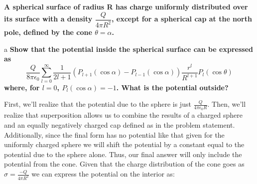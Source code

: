 \begin{homeworkProblem}
\textbf{A spherical surface of radius R has charge uniformly distributed over its surface 
with a density $\dfrac{Q}{4\pi R^2}$, except for a spherical cap at the north pole, defined by the 
cone $\theta = \alpha$.}

\begin{homeworkSection}{a}
\textbf{Show that the potential inside the spherical surface can be expressed as 
\[
\frac{Q}{8 \pi \epsilon_0} \sum\limits_{l=0}^{\infty} \frac{1}{2l+1}\left(P_{l+1}(\cos\alpha) - P_{l-1}(\cos\alpha)\right) \frac{r^l}{R^{l+1}} P_l(\cos\theta)
\]
where, for $l = 0$, $P_l(\cos \alpha) = -1$. What is the potential outside?}

First, we'll realize that the potential due to the sphere is just $\frac{Q}{4\pi\epsilon_0 R}$. Then, we'll realize that superposition allows us to combine the results of a charged sphere and an equally negatively charged cap defined as in the problem statement. Additionally, since the final form has no potential like that given for the uniformly charged sphere we will shift the potential by a constant equal to the potential due to the sphere alone. Thus, our final answer will only include the potential from the cone. Given that the charge distribution of the cone goes as $\sigma = \frac{-Q}{4\pi R^2}$ we can express the potential on the interior as:


\end{homeworkSection}
\end{homeworkProblem}
